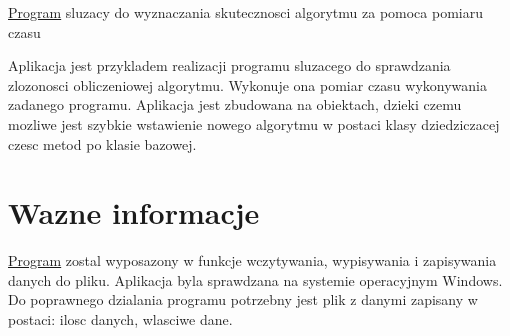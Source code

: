 \hyperlink{class_program}{Program} sluzacy do wyznaczania skutecznosci algorytmu za pomoca pomiaru czasu

Aplikacja jest przykladem realizacji programu sluzacego do sprawdzania zlozonosci obliczeniowej algorytmu. Wykonuje ona pomiar czasu wykonywania zadanego programu. Aplikacja jest zbudowana na obiektach, dzieki czemu mozliwe jest szybkie wstawienie nowego algorytmu w postaci klasy dziedziczacej czesc metod po klasie bazowej.\hypertarget{index_etykieta-wazne-informacje}{}\section{Wazne informacje}\label{index_etykieta-wazne-informacje}
\hyperlink{class_program}{Program} zostal wyposazony w funkcje wczytywania, wypisywania i zapisywania danych do pliku. Aplikacja byla sprawdzana na systemie operacyjnym Windows. Do poprawnego dzialania programu potrzebny jest plik z danymi zapisany w postaci\-: ilosc danych, wlasciwe dane. 